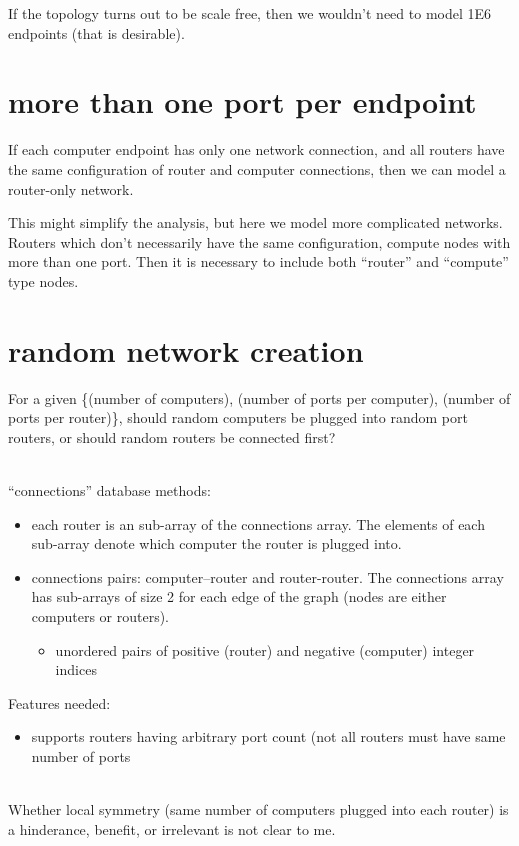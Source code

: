 \documentclass[pdftex]{article}
\begin{document}
If the topology turns out to be scale free, then we wouldn't need to model 1E6 endpoints (that is desirable).

\section{more than one port per endpoint}

If each computer endpoint has only one network connection, and all routers have the same configuration of router and computer connections, then we can model a router-only network. 

This might simplify the analysis, but here we model more complicated networks. Routers which don't necessarily have the same configuration, compute nodes with more than one port. Then it is necessary to include both ``router'' and ``compute'' type nodes.

\section{random network creation}

For a given \{(number of computers), (number of ports per computer), (number of ports per router)\}, should random computers be plugged into random port routers, or should random routers be connected first?

\ \\
``connections'' database methods:
\begin{itemize}
 \item each router is an sub-array of the connections array. The elements of each sub-array denote which computer the router is plugged into. 
 \item connections pairs: computer--router and router-router. The connections array has sub-arrays of size 2 for each edge of the graph (nodes are either computers or routers).
 \begin{itemize}
  \item unordered pairs of positive (router) and negative (computer) integer indices
 \end{itemize}

\end{itemize}
Features needed:
 \begin{itemize}
  \item supports routers having arbitrary port count (not all routers must have same number of ports
 \end{itemize}


\ \\
Whether local symmetry (same number of computers plugged into each router) is a hinderance, benefit, or irrelevant is not clear to me.
\end{document}
